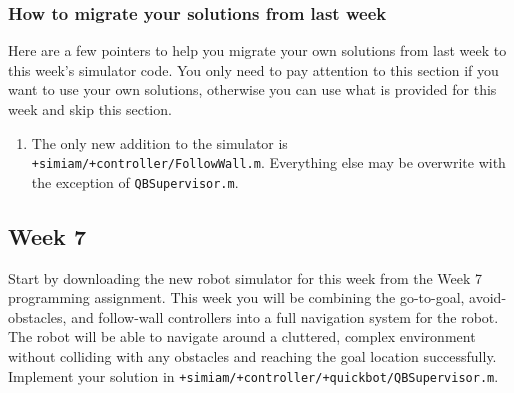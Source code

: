 \documentclass[10pt]{article}
\begin{document}
\subsubsection*{How to migrate your solutions from last week}
Here are a few pointers to help you migrate your own solutions from last week to this week's simulator code. You only need to pay attention to this section if you want to use your own solutions, otherwise you can use what is provided for this week and skip this section.

\begin{enumerate}
 \item The only new addition to the simulator is \texttt{+simiam/+controller/FollowWall.m}. Everything else may be overwrite with the exception of \texttt{QBSupervisor.m}.
\end{enumerate}

\newpage
\subsection{Week 7}
Start by downloading the new robot simulator for this week from the Week 7 programming assignment. This week you will be combining the go-to-goal, avoid-obstacles, and follow-wall controllers into a full navigation system for the robot. The robot will be able to navigate around a cluttered, complex environment without colliding with any obstacles and reaching the goal location successfully. Implement your solution in \texttt{+simiam/+controller/+quickbot/QBSupervisor.m}.
\end{document}
